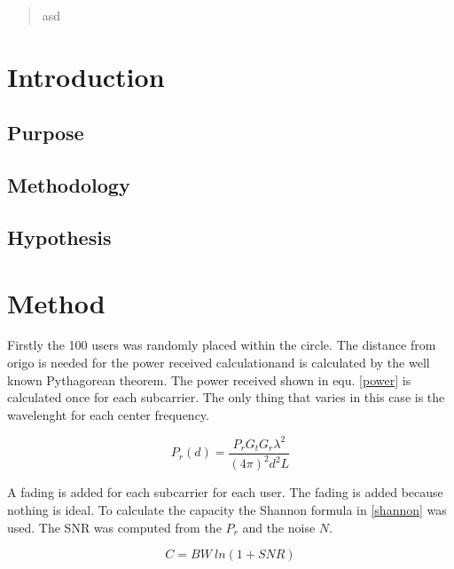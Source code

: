 \documentclass[twocolumn]{article}
\begin{document}
\pagestyle{fancy}
\fancyfoot[c]{}

\onecolumn
\begin{abstract}
asd
\end{abstract}
\clearpage

\tableofcontents
\clearpage
\setcounter{page}{1}
\fancyfoot[c]{\thepage}
\twocolumn


\section{Introduction}

\subsection{Purpose}
\subsection{Methodology}
\subsection{Hypothesis}

\section{Method}
Firstly the 100 users was randomly placed within the circle. The distance from origo is needed for the power received calculationand is calculated by the well known Pythagorean theorem. The power received shown in equ. \eqref{power}  is calculated once for each subcarrier. The only thing that varies in this case is the wavelenght for each center frequency.

\begin{equation}
\label{power}
P_r(d)=\frac{P_rG_tG_r\lambda^2}{(4\pi)^2d^2L}
\end{equation}

A fading is added for each subcarrier for each user. The fading is added because nothing is ideal.%
To calculate the capacity the Shannon formula in \eqref{shannon} was used. The SNR was computed from the $P_r$ and the noise $N$.

\begin{equation}
\label{shannon}
C=BW~ln(1+SNR)
\end{equation}
\end{document}
